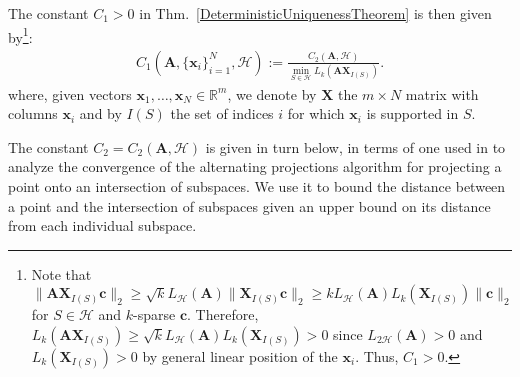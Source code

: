 \documentclass[9pt,twocolumn]{pnas-new}
\newtheorem{lemma}{Lemma}
\begin{document}


The constant $C_1 > 0$ in Thm.~\ref{DeterministicUniquenessTheorem} is then given by\footnote{Note that $\|\mathbf{AX}_{I(S)}\mathbf{c}\|_2 \geq \sqrt{k} L_\mathcal{H}(\mathbf{A})\|\mathbf{X}_{I(S)}\mathbf{c}\|_2 \geq k L_\mathcal{H}(\mathbf{A}) L_k(\mathbf{X}_{I(S)})\|\mathbf{c}\|_2$ for $S \in \mathcal{H}$ and $k$-sparse $\mathbf{c}$. Therefore, $L_k(\mathbf{AX}_{I(S)}) \geq \sqrt{k} L_\mathcal{H}(\mathbf{A}) L_k(\mathbf{X}_{I(S)}) > 0$ since $L_{2\mathcal{H}}(\mathbf{A})> 0$ and $L_k(\mathbf{X}_{I(S)}) > 0$ by general linear position of the $\mathbf{x}_i$. Thus, $C_1 > 0$.}:
\begin{align}\label{Cdef1}
C_1(\mathbf{A}, \{\mathbf{x}_i\}_{i=1}^N, \mathcal{H}) := \frac{ C_2(\mathbf{A}, \mathcal{H}) } { \min_{S \in \mathcal{H}} L_k(\mathbf{AX}_{I(S)}) }.
\end{align}
where, given vectors $\mathbf{x}_1, \ldots, \mathbf{x}_N \in \mathbb{R}^m$, we denote by $\mathbf{X}$ the $m \times N$ matrix with columns $\mathbf{x}_i$ and by $I(S)$ the set of indices $i$ for which $\mathbf{x}_i$ is supported in $S$.

The constant $C_2 = C_2(\mathbf{A}, \mathcal{H})$ is given in turn below, in terms of one used in \cite{Deutsch12} to analyze the convergence of the alternating projections algorithm for projecting a point onto an intersection of subspaces. 
We use it to bound the distance between a point and the intersection of subspaces given an upper bound on its distance from each individual subspace.
\end{document}
